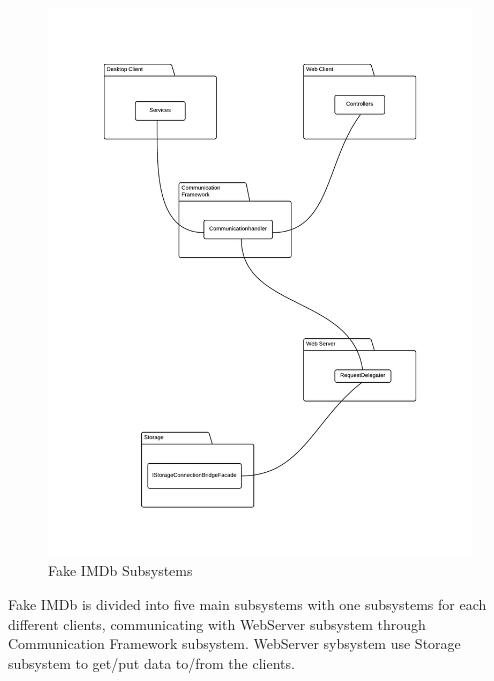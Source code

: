 \begin{figure}[H]
\includegraphics[scale=0.2]{img/FakeIMDbSubsystems.png}
\caption{Fake IMDb Subsystems}
\label{fig:FakeIMDBSubsystems}
\end{figure}

Fake IMDb is divided into five main subsystems with one subsystems for each different clients, communicating with WebServer subsystem through Communication Framework subsystem. WebServer sybsystem use Storage subsystem to get/put data to/from the clients.\\


